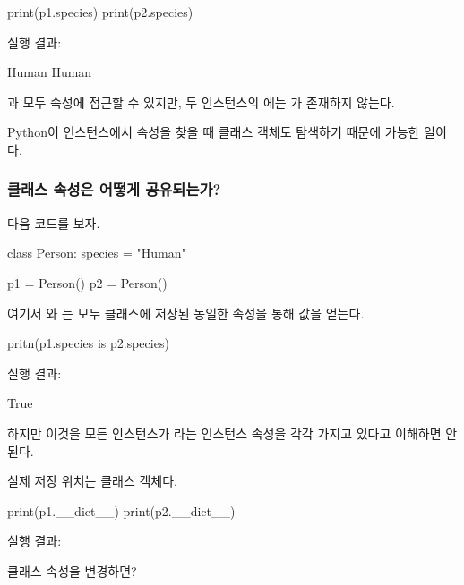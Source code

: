 \begin{dhkcode}
print(p1.species)
print(p2.species)
\end{dhkcode}

실행 결과:

\begin{dhkzsh}
Human
Human
\end{dhkzsh}

과  모두  속성에 접근할 수 있지만, 두 인스턴스의 에는 가 존재하지 않는다.

Python이 인스턴스에서 속성을 찾을 때 클래스 객체도 탐색하기 때문에 가능한 일이다.

\subsubsection{클래스 속성은 어떻게 공유되는가?}

다음 코드를 보자.

\begin{dhkcode}
class Person:
    species = "Human"

p1 = Person()
p2 = Person()
\end{dhkcode}

여기서 와 는 모두 클래스에 저장된 동일한 속성을 통해 값을 얻는다.

\begin{dhkcode}
pritn(p1.species is p2.species)
\end{dhkcode}

실행 결과:

\begin{dhkzsh}
True
\end{dhkzsh}

하지만 이것을 모든 인스턴스가 라는 인스턴스 속성을 각각 가지고 있다고 이해하면 안 된다.

실제 저장 위치는 클래스 객체다.

\begin{dhkcode}
print(p1.__dict__)
print(p2.__dict__)
\end{dhkcode}

실행 결과:

\begin{dhkzsh}
{}
{}
\end{dhkzsh}

\begin{dhknote}
\begin{dhksmry}[centered]
클래스 속성을 변경하면?
\end{dhksmry}
\end{dhknote}

